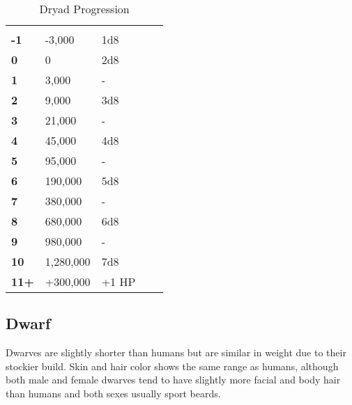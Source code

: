 \begin{multicols*}{2}
\begin {table}[H]
  \caption{Dryad Progression}
  \begin{tabularx}{\columnwidth}{>{\bfseries}YYYYY}
	 &  & \\
	-1 & -3,000 & 1d8\\
	0 & 0 & 2d8\\
	1 & 3,000 & -\\
	2 & 9,000 & 3d8\\
	3 & 21,000 & -\\
	4 & 45,000 & 4d8\\
	5 & 95,000 & -\\
	6 & 190,000 & 5d8\\
	7 & 380,000 & -\\
	8 & 680,000 & 6d8\\
	9 & 980,000 & -\\
	10 & 1,280,000 & 7d8\\
	11+ & +300,000 & +1 HP
  \end {tabularx}
\end {table}

\subsection{Dwarf}

Dwarves are slightly shorter than humans but are similar in weight due to their stockier build. Skin and hair color shows the same range as humans, although both male and female dwarves tend to have slightly more facial and body hair than humans and both sexes usually sport beards.


\end{multicols*}
